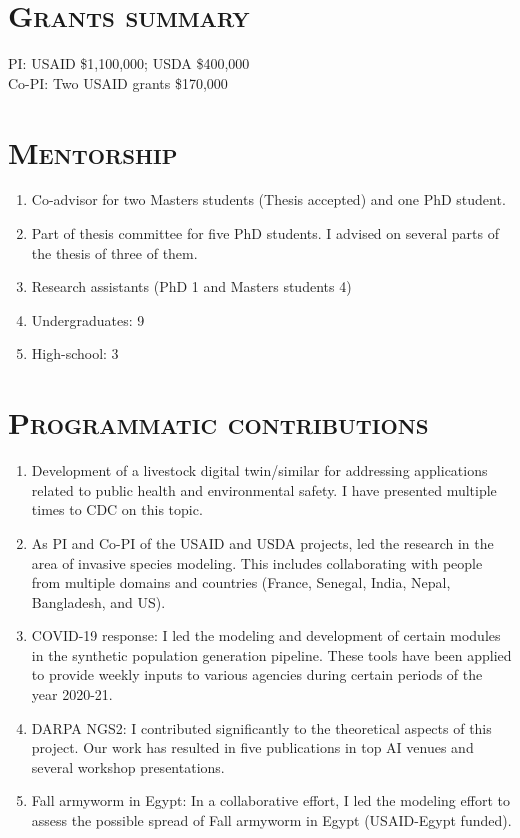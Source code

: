 \documentclass[margin,10pt]{res}
\begin{document}
\begin{resume}
\section{\textnormal{\textsc{Grants summary}}}
PI: USAID \$1,100,000; USDA \$400,000\\
Co-PI: Two USAID grants \$170,000

\section{\textnormal{\textsc{Mentorship}}}
\begin{enumerate}[$\circ$]
    \item Co-advisor for two Masters students (Thesis accepted) and one PhD
    student.
    \item Part of thesis committee for five PhD students. I advised on
    several parts of the thesis of three of them.
    \item Research assistants (PhD 1 and Masters students 4)
    \item Undergraduates: 9
    \item High-school: 3
\end{enumerate}


\section{\textnormal{\textsc{Programmatic contributions}}}
\begin{enumerate}[$\circ$]
\item Development of a livestock digital twin/similar for addressing
applications related to public health and environmental safety.  I have
presented multiple times to CDC on this topic.
\item As PI and Co-PI of the USAID and USDA projects, led the
research in the area of invasive species modeling. This includes
collaborating with people from multiple domains and countries (France,
Senegal, India, Nepal, Bangladesh, and US).
\item COVID-19 response: I led the modeling and development of certain
modules in the synthetic population generation pipeline. These tools have
been applied to provide weekly inputs to various agencies during
certain periods of the year 2020-21.
\item DARPA NGS2: I contributed significantly to the theoretical aspects of
this project. Our work has resulted in five publications in top AI venues
and several workshop presentations.
\item Fall armyworm in Egypt: In a collaborative effort, I led the modeling
effort to assess the possible spread of Fall armyworm in Egypt (USAID-Egypt funded).
\end{enumerate}


\end{resume}
\end{document}

